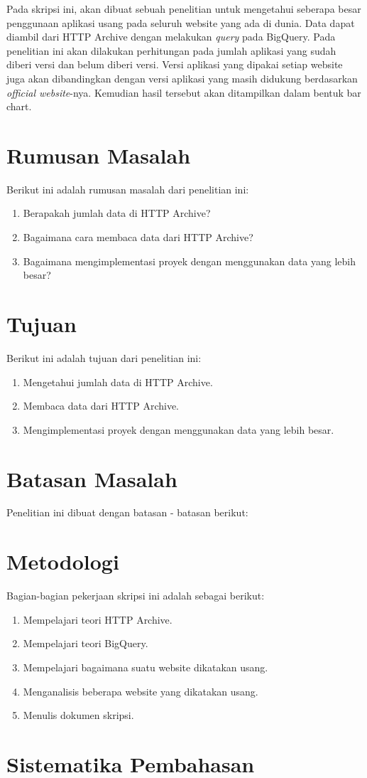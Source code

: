 Pada skripsi ini, akan dibuat sebuah penelitian untuk mengetahui seberapa besar penggunaan aplikasi usang pada seluruh website yang ada di dunia. Data dapat diambil dari HTTP Archive dengan melakukan \textit{query} pada BigQuery. Pada penelitian ini akan dilakukan perhitungan pada jumlah aplikasi yang sudah diberi versi dan belum diberi versi. Versi aplikasi yang dipakai setiap website juga akan dibandingkan dengan versi aplikasi yang masih didukung berdasarkan \textit{official website}-nya. Kemudian hasil tersebut akan ditampilkan dalam bentuk bar chart.


\section{Rumusan Masalah}
\label{sec:rumusan}
Berikut ini adalah rumusan masalah dari penelitian ini:
\begin{enumerate}
	\item Berapakah jumlah data di HTTP Archive?
	\item Bagaimana cara membaca data dari HTTP Archive?
	\item Bagaimana mengimplementasi proyek \cite{pascal} dengan menggunakan data yang lebih besar?
\end{enumerate}


\section{Tujuan}
\label{sec:tujuan}
Berikut ini adalah tujuan dari penelitian ini:
\begin{enumerate}
	\item Mengetahui jumlah data di HTTP Archive.
	\item Membaca data dari HTTP Archive.
	\item Mengimplementasi proyek \cite{pascal} dengan menggunakan data yang lebih besar.
\end{enumerate}


\section{Batasan Masalah}
\label{sec:batasan}
Penelitian ini dibuat dengan batasan - batasan berikut:


\section{Metodologi}
\label{sec:metlit}
Bagian-bagian pekerjaan skripsi ini adalah sebagai berikut:
\begin{enumerate}
	\item Mempelajari teori HTTP Archive.
	\item Mempelajari teori BigQuery.
	\item Mempelajari bagaimana suatu website dikatakan usang.
	\item Menganalisis beberapa website yang dikatakan usang.
	\item Menulis dokumen skripsi.
\end{enumerate}


\section{Sistematika Pembahasan}
\label{sec:sispem}
